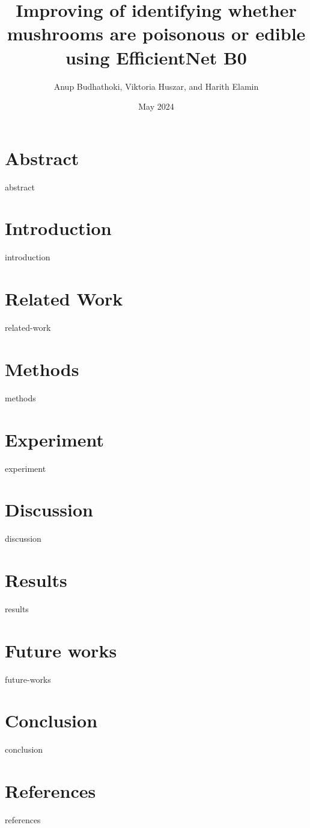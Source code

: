 \documentclass{article}
\title{Improving of identifying whether mushrooms are poisonous or edible using EfficientNet B0}
\author{ Anup Budhathoki, Viktoria Huszar, and Harith Elamin}
\affil{Department of Computer Science, Oslo metropolitan university, Norway}
\date{May 2024}
\begin{document}
\maketitle

\begin{multicols}{2}
\section{Abstract}
{abstract}
\section{Introduction}
{introduction}
\section{Related Work}
{related-work}
\section{Methods}
{methods}
\section{Experiment}
{experiment}
\section{Discussion}
{discussion}
\section{Results}
{results}
\section{Future works}
{future-works}
\section{Conclusion}
{conclusion}
\section{References}
{references}
\end{multicols}
\end{document}
